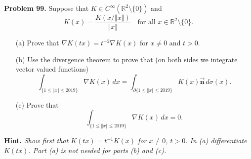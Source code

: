 \documentclass[11pt]{article}
\theoremstyle{definition}
\theoremstyle{definition}
\begin{document}
\noindent
{\bf Problem 99.}
Suppose that $K\in C^\infty(\mathbb{R}^2\setminus \{ 0\})$ and
$$
K(x)=\frac{K(x/\Vert x\Vert)}{\Vert x\Vert}
\quad
\text{for all $x\in\mathbb{R}^2\setminus\{0\}$.}
$$
\begin{itemize}
	\item[(a)] Prove that $\nabla K(tx)=t^{-2}\nabla K(x)$ for $x\neq 0$ and $t>0$.
	\item[(b)] Use the divergence theorem to prove that (on both sides we integrate vector valued functions)
	$$
	\int_{\{1\leq \Vert x\Vert\leq 2019\}} \nabla K(x)\, dx=
	\int_{\partial \{1\leq \Vert x\Vert\leq 2019\}} K(x)\vec{\mathbf{n}}\, d\sigma(x).
	$$
	\item[(c)] Prove that
	$$
	\int_{\{1\leq \Vert x\Vert\leq 2019\}} \nabla K(x)\, dx=0.
	$$
\end{itemize}
{\bf Hint.} {\em Show first that
	$K(tx)=t^{-1}K(x)$ for $x\neq 0$, $t>0$. In (a) differentiate $K(tx)$. Part (a) is not needed for parts (b) and (c).}
\end{document}
